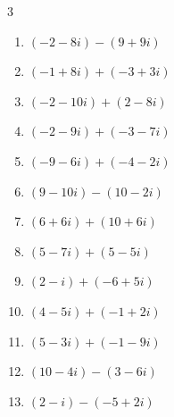 \begin{multicols}{3}
\begin{enumerate}
        \phantom{$\displaystyle =-2+7i$}

  \item $\displaystyle (-2-8i) - (9+9i)$

        \phantom{$\displaystyle =-11-17i$}

  \item $\displaystyle (-1+8i) + (-3+3i)$

        \phantom{$\displaystyle =-4+11i$}

  \item $\displaystyle (-2-10i) + (2-8i)$

        \phantom{$\displaystyle =-18i$}

  \item $\displaystyle (-2-9i) + (-3-7i)$

        \phantom{$\displaystyle =-5-16i$}

  \item $\displaystyle (-9-6i) + (-4-2i)$

        \phantom{$\displaystyle =-13-8i$}

  \item $\displaystyle (9-10i) - (10-2i)$

        \phantom{$\displaystyle =-1-8i$}

  \item $\displaystyle (6+6i) + (10+6i)$

        \phantom{$\displaystyle =16+12i$}

  \item $\displaystyle (5-7i) + (5-5i)$

        \phantom{$\displaystyle =10-12i$}

  \item $\displaystyle (2-i) + (-6+5i)$

        \phantom{$\displaystyle =-4+4i$}

  \item $\displaystyle (4-5i) + (-1+2i)$

        \phantom{$\displaystyle =3-3i$}

  \item $\displaystyle (5-3i) + (-1-9i)$

        \phantom{$\displaystyle =4-12i$}

  \item $\displaystyle (10-4i) - (3-6i)$

        \phantom{$\displaystyle =7+2i$}

  \item $\displaystyle (2-i) - (-5+2i)$


\end{enumerate}
\end{multicols}
